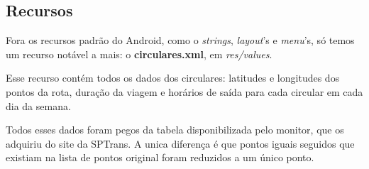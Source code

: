 \subsection{Recursos}
Fora os recursos padrão do Android, como o \textit{strings}, \textit{layout}'s e \textit{menu}'s,
só temos um recurso notável a mais: o \textbf{circulares.xml}, em \textit{res/values}.

Esse recurso contém todos os dados dos circulares: latitudes e longitudes dos pontos da rota,
duração da viagem e horários de saída para cada circular em cada dia da semana.

Todos esses dados foram pegos da tabela disponibilizada pelo monitor, que os adquiriu do site
da SPTrans. A unica diferença é que pontos iguais seguidos que existiam na lista de pontos
original foram reduzidos a um único ponto.



